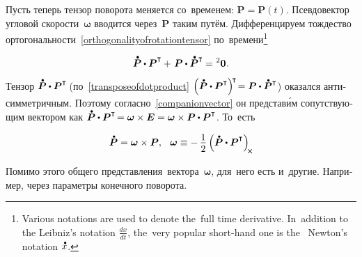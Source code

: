 \begin{otherlanguage}{russian}
Пусть теперь тензор поворота меняется со~временем: ${\bm{P} \!=\! \bm{P}(t)}$.
Псевдовектор угловой скорости~${\bm{\omega}}$ вводится через~$\bm{P}$ таким путём.
Дифференцируем тождество ортогональности~\eqref{orthogonalityofrotationtensor} по~времени\footnote{Various notations are used to denote the~full time derivative. In~addition to the Leibniz’s notation ${\frac{dx}{dt}}$, the~very popular short\hbox{-}hand one is the~ Newton’s notation ${\mathdotabove{x}}$.}

\nopagebreak\vspace{-0.1em}\begin{equation*}
\mathdotabove{\bm{P}} \dotp \bm{P}^{\T} \hspace{-0.1ex} + \hspace{.25ex} \bm{P} \dotp \mathdotabove{\bm{P}}^{\T} \hspace{-0.1ex} = \hspace{.1ex} {^2\bm{0}}
\hspace{.1ex} .
\end{equation*}

Тензор ${\mathdotabove{\bm{P}} \dotp \bm{P}^{\T\!}}$ (по~\eqref{transposeofdotproduct} ${\left({ \mathdotabove{\bm{P}} \dotp \bm{P}^{\T} }\right)^{\raisemath{-0.25em}{\!\T}} \hspace{-0.4ex} = \bm{P} \dotp \mathdotabove{\bm{P}}^{\T}}$) оказался анти\-сим\-метрич\-ным.
Поэтому согласно~\eqref{companionvector} он представ\'{и}м сопутствующим вектором как ${\mathdotabove{\bm{P}} \dotp \bm{P}^{\T\!} = \bm{\omega} \times \bm{E} = \bm{\omega} \times \bm{P} \dotp \bm{P}^{\T}}$\!.
То~есть

\nopagebreak\vspace{-0.1em}\begin{equation}\label{angularvelocityvector}
\mathdotabove{\bm{P}} = \bm{\omega} \times \bm{P}, \;\:\:
\bm{\omega} \equiv -\, \displaystyle \onehalf \left( \mathdotabove{\bm{P}} \dotp \bm{P}^{\T} \right)_{\hspace{-0.2em}\Xcompanion}
\vspace{-0.25em}\end{equation}

Помимо этого общего представления~вектора~${\bm{\omega}}$, для~него есть и~другие. Например, через параметры конечного поворота.


\end{otherlanguage}
